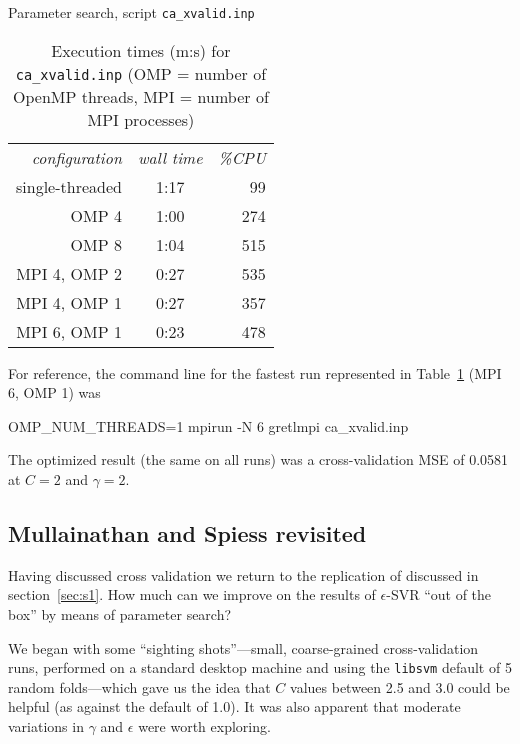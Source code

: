 \documentclass{article}
\begin{document}
\begin{script}[htbp]
  \caption{Parameter search, script \texttt{ca\_xvalid.inp}}
  \label{listing:cadata}
\end{script}

\begin{table}[htbp]
\centering
\begin{tabular}{rcr}
\textit{configuration} & \textit{wall time} & \textit{\%CPU} \\
single-threaded & 1:17 & 99 \\
OMP 4 & 1:00 & 274 \\
OMP 8 & 1:04 & 515 \\
MPI 4, OMP 2 & 0:27 & 535 \\
MPI 4, OMP 1 & 0:27 & 357 \\
MPI 6, OMP 1 & 0:23 & 478
\end{tabular}
\caption{Execution times (m:s) for \texttt{ca\_xvalid.inp} (OMP =
  number of OpenMP threads, MPI = number of MPI processes)}
\label{tab:cadata}
\end{table}

For reference, the command line for the fastest run represented in
Table~\ref{tab:cadata} (MPI 6, OMP 1) was
\begin{code}
OMP_NUM_THREADS=1 mpirun -N 6 gretlmpi ca_xvalid.inp
\end{code}
The optimized result (the same on all runs) was a cross-validation MSE
of 0.0581 at $C=2$ and $$.


\subsection{Mullainathan and Spiess revisited}
\label{sec:ms-xvalid}

Having discussed cross validation we return to the replication of
\cite{mull-spiess17} discussed in section~\ref{sec:s1}. How much
can we improve on the results of $\epsilon$-SVR ``out of the
box'' by means of parameter search?

We began with some ``sighting shots''---small, coarse-grained
cross-validation runs, performed on a standard desktop machine and
using the \texttt{libsvm} default of 5 random folds---which gave us
the idea that $C$ values between 2.5 and 3.0 could be helpful (as
against the default of 1.0). It was also apparent that moderate
variations in $\gamma$ and $\epsilon$ were worth exploring.
\end{document}
